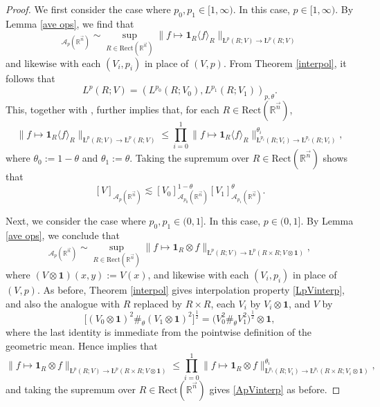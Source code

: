 \documentclass[11pt, reqno]{amsart}
\theoremstyle{definition}
\theoremstyle{remark}
\numberwithin{equation}{section}
\newcommand{\A}{\mathscr A}
\newcommand{\R}{\mathbb R}
\newcommand{\vn}{\vec n}
\newcommand{\one}{\mathbf{1}}
\newcommand{\ave}[1]{\langle #1\rangle}
\newcommand{\aveL}{\textit{\L}}
\newcommand{\Rect}{\mathrm{Rect}}
\begin{document}
\begin{proof}
We first consider the case where $p_0,p_1\in[1,\infty)$.
In this case, $p\in[1,\infty)$. By Lemma \ref{ave ops}, we find that
\begin{equation*}
[V]_{\A_p(\R^{\vn})}\sim\sup_{R\in\Rect(\R^{\vn})}
\|f\mapsto\one_R\ave{f}_R\|_{\aveL^p(R;V)\to \aveL^p(R;V)}
\end{equation*}
and likewise with each $(V_i,p_i)$ in place of $(V,p)$.
From Theorem \ref{interpol}, it follows that
\begin{equation}\label{LpVinterp}
L^p(R;V)=(L^{p_0}(R;V_0),L^{p_1}(R;V_1))_{p,\theta}.
\end{equation}
This, together with \cite[Theorem 3.11.2]{BL76},
further implies that, for each $R\in\Rect(\R^{\vn})$,
\begin{equation*}
\|f\mapsto\one_R\ave{f}_R\|_{\aveL^p(R;V)\to \aveL^p(R;V)}
\leq\prod_{i=0}^1 \|f\mapsto\one_R\ave{f}_R\|_{\aveL^{p_i}(R;V_i)\to \aveL^{p_i}(R;V_i)}^{\theta_i},
\end{equation*}
where $\theta_0:=1-\theta$ and $\theta_1:=\theta$. Taking the supremum over $R\in\Rect(\R^{\vn})$ shows that
\begin{equation}\label{ApVinterp}
[V]_{\A_p(\R^{\vn})}\lesssim[V_0]_{\A_{p_0}(\R^{\vn})}^{1-\theta}[V_1]_{\A_{p_1}(\R^{\vn})}^\theta.
\end{equation}

Next, we consider the case where $p_0,p_1\in(0,1]$.
In this case, $p\in(0,1]$. By Lemma \ref{ave ops}, we conclude that
\begin{equation*}
[V]_{\A_p(\R^{\vn})}\sim\sup_{R\in\Rect(\R^{\vn})}
\|f\mapsto\one_R\otimes f\|_{\aveL^p(R;V)\to \aveL^p(R\times R;V\otimes\one)},
\end{equation*}
where $(V\otimes\one)(x,y):=V(x)$, and likewise with each $(V_i,p_i)$ in place of $(V,p)$. As before, Theorem \ref{interpol} gives interpolation property \eqref{LpVinterp}, and also the analogue with $R$ replaced by $R\times R$, each $V_i$ by $V_i\otimes\one$, and $V$ by
\begin{equation*}
\Big[(V_0\otimes\one)^2\#_\theta(V_1\otimes\one)^2\Big]^{\frac12}
=\Big(V_0^2\#_\theta V_1^2\Big)^{\frac12}\otimes\one,
\end{equation*}
where the last identity is immediate from the pointwise definition of the geometric mean. Hence \cite[Theorem 3.11.2]{BL76} implies that
\begin{equation*}
\|f\mapsto\one_R\otimes f\|_{\aveL^p(R;V)\to \aveL^p(R\times R;V\otimes\one)}
\leq\prod_{i=0}^1 \|f\mapsto\one_R\otimes f\|_{\aveL^{p_i}(R;V_i)\to \aveL^{p_i}(R\times R;V_i\otimes\one)}^{\theta_i},
\end{equation*}
and taking the supremum over $R\in\Rect(\R^{\vn})$ gives \eqref{ApVinterp} as before.


\end{proof}
\end{document}
